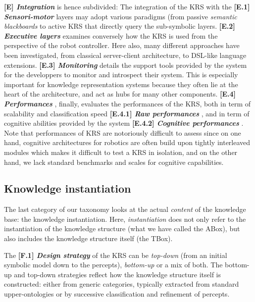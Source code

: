 \documentclass{IEEEtran}
\newcommand{\taxon}[2]{%
    \textbf{[#1] \emph{#2}}
}
\begin{document}
\taxon{E}{Integration} is hence subdivided: The integration of the KRS with the
\taxon{E.1}{Sensori-motor} layers may adopt various paradigms (from passive
\emph{semantic blackboards} to active KRS that directly query the sub-symbolic
layers. \taxon{E.2}{Executive layers} examines conversely how the KRS is used
from the perspective of the robot controller. Here also, many different
approaches have been investigated, from classical server-client architecture, to
DSL-like language extensions. \taxon{E.3}{Monitoring} details the support tools
provided by the system for the developpers to monitor and introspect their
system. This is especially important for knowledge representation systems
because they often lie at the heart of the architecture, and act as hubs for
many other components. \taxon{E.4}{Performances}, finally, evaluates the
performances of the KRS, both in term of scalability and classification speed
\taxon{E.4.1}{Raw performances}, and in term of cognitive abilities provided by
the system \taxon{E.4.2}{Cognitive performances}. Note that performances of KRS
are notoriously difficult to assess since on one hand, cognitive architectures
for robotics are often build upon tightly interleaved modules which makes it
difficult to test a KRS in isolation, and on the other hand, we lack standard
benchmarks and scales for cognitive capabilities.

\subsection{Knowledge instantiation}

The last category of our taxonomy looks at the actual \emph{content} of the
knowledge base: the knowledge instantiation. Here, \emph{instantiation} does
not only refer to the instantiation of the knowledge structure (what we have
called the ABox), but also includes the knowledge structure itself (the TBox).

The \taxon{F.1}{Design strategy} of the KRS can be \emph{top-down} (from an
initial symbolic model down to the percepts), \emph{bottom-up} or  a mix of
both. The bottom-up and top-down strategies reflect how the knowledge structure
itself is constructed: either from generic categories, typically extracted from
standard upper-ontologies or by successive classification and refinement of
percepts.
\end{document}
